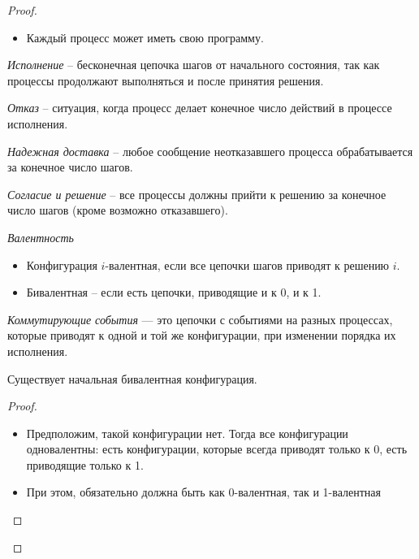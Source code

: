 \begin{proof}
\begin{itemize}
        \item Каждый процесс может иметь свою программу.
    \end{itemize}
    \begin{definition}
        \textit{Исполнение} -- бесконечная цепочка шагов от начального состояния, 
        так как процессы продолжают выполняться и после принятия решения.
    \end{definition}
    \begin{definition}
        \textit{Отказ} -- ситуация, когда процесс делает конечное число действий в процессе исполнения.
    \end{definition}
    \begin{definition}
        \textit{Надежная доставка} -- любое сообщение неотказавшего процесса 
        обрабатывается за конечное число шагов.
    \end{definition}
    \begin{definition}
        \textit{Согласие и решение} -- все процессы должны прийти к решению за 
        конечное число шагов (кроме возможно отказавшего).
    \end{definition}
    \begin{definition}
        \textit{Валентность}
        \begin{itemize}
            \item Конфигурация $i$-валентная, если все цепочки шагов приводят к решению $i$.
            \item Бивалентная -- если есть цепочки, приводящие и к 0, и к 1.
        \end{itemize}
    \end{definition}
    \begin{definition}
        \textit{Коммутирующие события} --- это цепочки с событиями на разных процессах, 
        которые приводят к одной и той же конфигурации, при изменении порядка их исполнения.
    \end{definition}
    \begin{lemma} 
        Существует начальная бивалентная конфигурация.
    \end{lemma}
    \begin{proof}
        \enewline
        \begin{itemize}
            \item Предположим, такой конфигурации нет. Тогда все конфигурации одновалентны:
                есть конфигурации, которые всегда приводят только к 0, есть приводящие только к 1.
            \item При этом, обязательно должна быть как 0-валентная, так и 1-валентная

\end{itemize}
\end{proof}
\end{proof}
